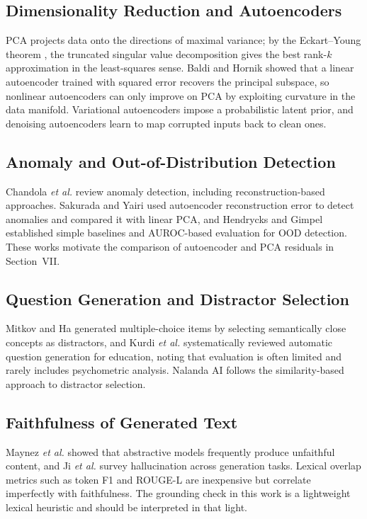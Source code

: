 \documentclass[conference]{IEEEtran}
\begin{document}
\subsection{Dimensionality Reduction and Autoencoders}
PCA \cite{pearson1901,jolliffe2016} projects data onto the directions of maximal variance; by the Eckart--Young theorem \cite{eckart1936}, the truncated singular value decomposition gives the best rank-$k$ approximation in the least-squares sense. Baldi and Hornik \cite{baldi1989} showed that a linear autoencoder trained with squared error recovers the principal subspace, so nonlinear autoencoders \cite{hinton2006} can only improve on PCA by exploiting curvature in the data manifold. Variational autoencoders \cite{kingma2014} impose a probabilistic latent prior, and denoising autoencoders \cite{vincent2008} learn to map corrupted inputs back to clean ones.

\subsection{Anomaly and Out-of-Distribution Detection}
Chandola \emph{et al.} \cite{chandola2009} review anomaly detection, including reconstruction-based approaches. Sakurada and Yairi \cite{sakurada2014} used autoencoder reconstruction error to detect anomalies and compared it with linear PCA, and Hendrycks and Gimpel \cite{hendrycks2017} established simple baselines and AUROC-based evaluation for OOD detection. These works motivate the comparison of autoencoder and PCA residuals in Section~VII.

\subsection{Question Generation and Distractor Selection}
Mitkov and Ha \cite{mitkov2003} generated multiple-choice items by selecting semantically close concepts as distractors, and Kurdi \emph{et al.} \cite{kurdi2020} systematically reviewed automatic question generation for education, noting that evaluation is often limited and rarely includes psychometric analysis. Nalanda AI follows the similarity-based approach to distractor selection.

\subsection{Faithfulness of Generated Text}
Maynez \emph{et al.} \cite{maynez2020} showed that abstractive models frequently produce unfaithful content, and Ji \emph{et al.} \cite{ji2023} survey hallucination across generation tasks. Lexical overlap metrics such as token F1 \cite{rajpurkar2016} and ROUGE-L \cite{lin2004} are inexpensive but correlate imperfectly with faithfulness. The grounding check in this work is a lightweight lexical heuristic and should be interpreted in that light.
\end{document}
